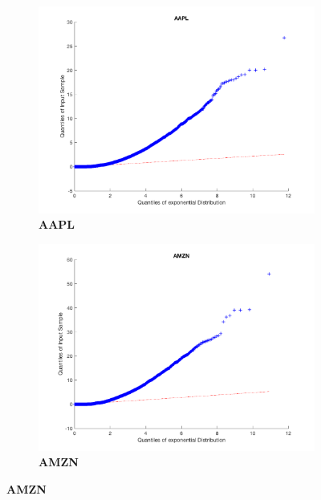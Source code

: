 \begin{figure}[htbp]

\centering
\begin{subfigure}[t]{0.49\textwidth}
\captionsetup{labelformat=empty}

\caption{\textbf{AAPL}}
\includegraphics[width=\textwidth, trim = 0 0 0 30, clip]{QQ_Plots/AAPL_QQ.png}

\end{subfigure}
\begin{subfigure}[t]{0.49\textwidth}
\captionsetup{labelformat=empty}

\caption{\textbf{AMZN}}
\includegraphics[width=\textwidth, trim = 0 0 0 30, clip]{QQ_Plots/AMZN_QQ.png}
\end{subfigure}


\end{figure}
